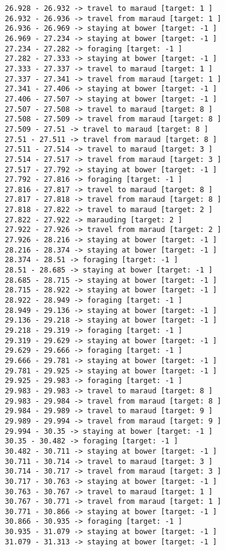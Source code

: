 \documentclass[11pt]{article}
\begin{document}
\begin{Verbatim}[commandchars=\\\{\}]
26.928 - 26.932 -> travel to maraud [target: 1 ]
26.932 - 26.936 -> travel from maraud [target: 1 ]
26.936 - 26.969 -> staying at bower [target: -1 ]
26.969 - 27.234 -> staying at bower [target: -1 ]
27.234 - 27.282 -> foraging [target: -1 ]
27.282 - 27.333 -> staying at bower [target: -1 ]
27.333 - 27.337 -> travel to maraud [target: 1 ]
27.337 - 27.341 -> travel from maraud [target: 1 ]
27.341 - 27.406 -> staying at bower [target: -1 ]
27.406 - 27.507 -> staying at bower [target: -1 ]
27.507 - 27.508 -> travel to maraud [target: 8 ]
27.508 - 27.509 -> travel from maraud [target: 8 ]
27.509 - 27.51 -> travel to maraud [target: 8 ]
27.51 - 27.511 -> travel from maraud [target: 8 ]
27.511 - 27.514 -> travel to maraud [target: 3 ]
27.514 - 27.517 -> travel from maraud [target: 3 ]
27.517 - 27.792 -> staying at bower [target: -1 ]
27.792 - 27.816 -> foraging [target: -1 ]
27.816 - 27.817 -> travel to maraud [target: 8 ]
27.817 - 27.818 -> travel from maraud [target: 8 ]
27.818 - 27.822 -> travel to maraud [target: 2 ]
27.822 - 27.922 -> marauding [target: 2 ]
27.922 - 27.926 -> travel from maraud [target: 2 ]
27.926 - 28.216 -> staying at bower [target: -1 ]
28.216 - 28.374 -> staying at bower [target: -1 ]
28.374 - 28.51 -> foraging [target: -1 ]
28.51 - 28.685 -> staying at bower [target: -1 ]
28.685 - 28.715 -> staying at bower [target: -1 ]
28.715 - 28.922 -> staying at bower [target: -1 ]
28.922 - 28.949 -> foraging [target: -1 ]
28.949 - 29.136 -> staying at bower [target: -1 ]
29.136 - 29.218 -> staying at bower [target: -1 ]
29.218 - 29.319 -> foraging [target: -1 ]
29.319 - 29.629 -> staying at bower [target: -1 ]
29.629 - 29.666 -> foraging [target: -1 ]
29.666 - 29.781 -> staying at bower [target: -1 ]
29.781 - 29.925 -> staying at bower [target: -1 ]
29.925 - 29.983 -> foraging [target: -1 ]
29.983 - 29.983 -> travel to maraud [target: 8 ]
29.983 - 29.984 -> travel from maraud [target: 8 ]
29.984 - 29.989 -> travel to maraud [target: 9 ]
29.989 - 29.994 -> travel from maraud [target: 9 ]
29.994 - 30.35 -> staying at bower [target: -1 ]
30.35 - 30.482 -> foraging [target: -1 ]
30.482 - 30.711 -> staying at bower [target: -1 ]
30.711 - 30.714 -> travel to maraud [target: 3 ]
30.714 - 30.717 -> travel from maraud [target: 3 ]
30.717 - 30.763 -> staying at bower [target: -1 ]
30.763 - 30.767 -> travel to maraud [target: 1 ]
30.767 - 30.771 -> travel from maraud [target: 1 ]
30.771 - 30.866 -> staying at bower [target: -1 ]
30.866 - 30.935 -> foraging [target: -1 ]
30.935 - 31.079 -> staying at bower [target: -1 ]
31.079 - 31.313 -> staying at bower [target: -1 ]

\end{Verbatim}
\end{document}
